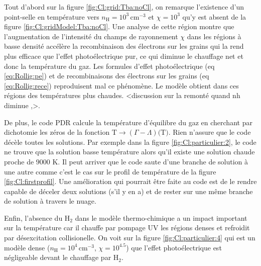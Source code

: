 Tout d'abord sur la figure \ref{fig:Cl:grid:Tba:noCl}, on remarque l'existence d'un point-selle en température vers $n_\mathrm{H}=10^3 \, \mathrm{cm}^{-3}$ et $\chi=10^3$ qu'y est absent de la figure \ref{fig:Cl:gridModel:Tba:noCl}. Une analyse de cette région montre que l'augmentation de l'intensité du champs de rayonnement $\chi$ dans les régions à basse densité accélère la recombinaison des électrons sur les grains qui la rend plus efficace que l'effet photoélectrique pur, ce qui diminue le chauffage net et donc la température du gaz. Les formules d'effet photoélectrique (eq \ref{eq:Rollig:pe}) et de recombinaisons des électrons sur les grains (eq \ref{eq:Rollig:rece}) reproduisent mal ce phénomène. Le modèle obtient dans ces régions des températures plus chaudes. <discussion sur la remonté quand nh diminue ,>. \newline 

De plus, le code PDR calcule la température d'équilibre du gaz en cherchant par dichotomie les zéros de la fonction $\mathrm{T} \rightarrow (\Gamma - \Lambda)(\mathrm{T)}$. Rien n'assure que le code décèle toutes les solutions. Par exemple dans la figure \ref{fig:Cl:particulier:2}, le code ne trouve que la solution basse température alors qu'il existe une solution chaude proche de $9000$ K. Il peut arriver que le code saute d'une branche de solution à une autre comme c'est le cas sur le profil de température de la figure \ref{fig:Cl:firstprofil}. Une amélioration qui pourrait être faite au code est de le rendre capable de déceler deux solutions (s'il y en a) et de rester sur une même branche de solution à travers le nuage. \newline 

Enfin, l'absence du $\mathrm{H}_2$ dans le modèle thermo-chimique a un impact important sur la température car il chauffe par pompage UV les régions denses et refroidit par désexcitation collisionelle. On voit sur la figure \ref{fig:Cl:particulier:4} qui est un modèle dense ($n_\mathrm{H}=10^4 \, \mathrm{cm}^{-3}$, $\chi=10^{4.5}$) que l'effet photoélectrique est négligeable devant le chauffage par $\mathrm{H}_2$. 


